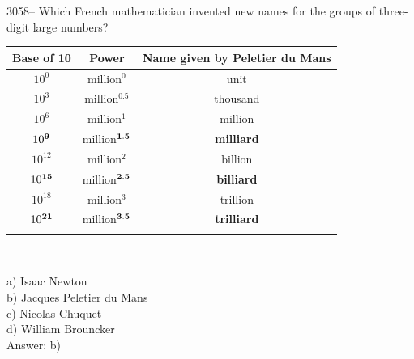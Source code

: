 \documentclass[letterpaper, 12pt]{article}
\begin{document}
3058-- Which French mathematician invented new names for the groups of three-digit large numbers?\\
\begin{center}
\begin{tabular}{|c|c|c|} \hline
{\bf Base of 10} & {\bf Power} & {\bf Name given by Peletier du Mans} \\ \hline \hline
$10^{0}$ & million$^{0}$ & unit \\[1mm] \hline
$10^{3}$ & million$^{0.5}$ & thousand \\[1mm] \hline
$10^{6}$ & million$^{1}$ & million \\[1mm] \hline
$10^{\bf{9}}$ & million$^{\bf{1.5}}$ & \textbf{milliard} \\[1mm] \hline
$10^{12}$ & million$^{2}$ & billion \\[1mm] \hline
$10^{\bf{15}}$ & million$^{\bf{2.5}}$ & \textbf{billiard} \\[1mm] \hline
$10^{18}$ & million$^{3}$ & trillion \\[1mm] \hline
$10^{\bf{21}}$ & million$^{\bf{3.5}}$ & \textbf{trilliard} \\[1mm] \hline
\multicolumn{3}{c}{}\\
\end{tabular}\\
\end{center}

a) Isaac Newton\\
b) Jacques Peletier du Mans\\
c) Nicolas Chuquet\\
d) William Brouncker\\

Answer: b)\\
\end{document}
